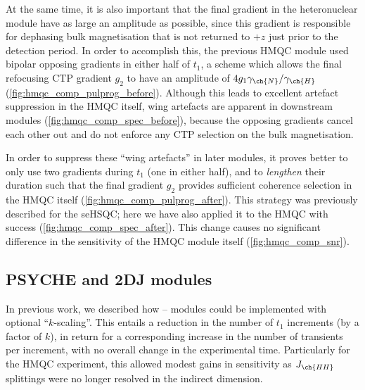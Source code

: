 \documentclass[a4paper,11pt]{article}
\newcommand{\proton}{\ch{^{1}H}}
\newcommand{\nitrogen}{\ch{^{15}N}}
\newcommand{\HN}{\proton{}--\nitrogen{}}
\begin{document}
\begin{refsection}
At the same time, it is also important that the final gradient in the heteronuclear module have as large an amplitude as possible, since this gradient is responsible for dephasing bulk magnetisation that is not returned to \(+z\) just prior to the detection period.
In order to accomplish this, the previous \nitrogen{} HMQC module used bipolar opposing gradients in either half of \(t_1\), a scheme which allows the final refocusing CTP gradient \(g_2\) to have an amplitude of \(4g_1\gamma_{\ch{N}}/\gamma_{\ch{H}}\) (\cref{fig:hmqc_comp_pulprog_before}).
Although this leads to excellent artefact suppression in the \nitrogen{} HMQC itself, wing artefacts are apparent in downstream modules (\cref{fig:hmqc_comp_spec_before}), because the opposing gradients cancel each other out and do not enforce any CTP selection on the bulk magnetisation.

In order to suppress these ``wing artefacts'' in later modules, it proves better to only use two gradients during \(t_1\) (one in either half), and to \textit{lengthen} their duration such that the final gradient \(g_2\) provides sufficient coherence selection in the HMQC itself (\cref{fig:hmqc_comp_pulprog_after}).
This strategy was previously described for the \nitrogen{} seHSQC;\autocite{Yong2021JMR} here we have also applied it to the HMQC with success (\cref{fig:hmqc_comp_spec_after}).
This change causes no significant difference in the sensitivity of the HMQC module itself (\cref{fig:hmqc_comp_snr}).

\subsection{PSYCHE and 2DJ modules}

In previous work,\autocite{Yong2021JMR} we described how \HN{} modules could be implemented with optional ``\(k\)-scaling''.\autocite{PerezTrujillo2007MRC}
This entails a reduction in the number of \(t_1\) increments (by a factor of \(k\)), in return for a corresponding increase in the number of transients per increment, with no overall change in the experimental time.
Particularly for the HMQC experiment, this allowed modest gains in sensitivity as \(J_{\ch{HH}}\) splittings were no longer resolved in the indirect dimension.


\end{refsection}
\end{document}
